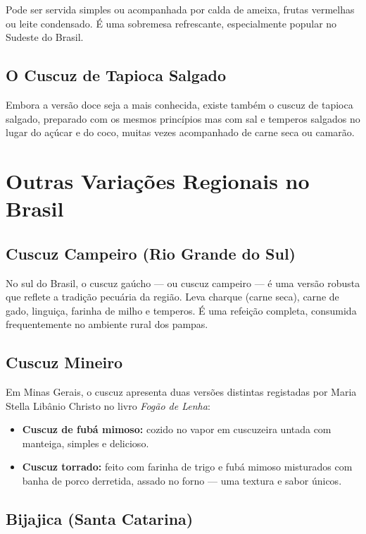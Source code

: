 \documentclass[12pt,a4paper,openright]{book}
\begin{document}
Pode ser servida simples ou acompanhada por calda de ameixa, frutas vermelhas ou leite condensado. É uma sobremesa refrescante, especialmente popular no Sudeste do Brasil.

\section{O Cuscuz de Tapioca Salgado}

Embora a versão doce seja a mais conhecida, existe também o cuscuz de tapioca salgado, preparado com os mesmos princípios mas com sal e temperos salgados no lugar do açúcar e do coco, muitas vezes acompanhado de carne seca ou camarão.

\chapter{Outras Variações Regionais no Brasil}

\section{Cuscuz Campeiro (Rio Grande do Sul)}

No sul do Brasil, o cuscuz gaúcho --- ou cuscuz campeiro --- é uma versão robusta que reflete a tradição pecuária da região. Leva charque (carne seca), carne de gado, linguiça, farinha de milho e temperos. É uma refeição completa, consumida frequentemente no ambiente rural dos pampas.

\section{Cuscuz Mineiro}

Em Minas Gerais, o cuscuz apresenta duas versões distintas registadas por Maria Stella Libânio Christo no livro \textit{Fogão de Lenha}:
\begin{itemize}
    \item \textbf{Cuscuz de fubá mimoso:} cozido no vapor em cuscuzeira untada com manteiga, simples e delicioso.
    \item \textbf{Cuscuz torrado:} feito com farinha de trigo e fubá mimoso misturados com banha de porco derretida, assado no forno --- uma textura e sabor únicos.
\end{itemize}

\section{Bijajica (Santa Catarina)}
\end{document}
